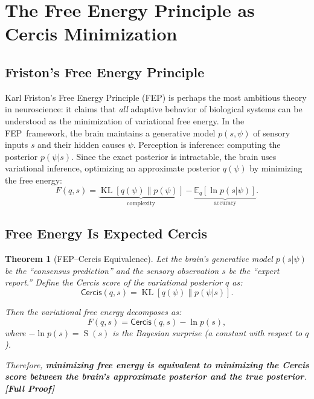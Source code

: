 \documentclass[12pt,a4paper]{article}
\newtheorem{theorem}{Theorem}[section]
\theoremstyle{remark}
\newcommand{\E}{\mathbb{E}}
\newcommand{\Cercis}{\textsf{Cercis}}
\newcommand{\FEP}{\textsf{FEP}}
\newcommand{\FreeEnergy}{F}
\DeclareMathOperator{\KL}{KL}
\DeclareMathOperator{\Surprise}{S}
\newcommand{\rigorFull}{\textbf{[Full Proof]}}
\begin{document}
\section{The Free Energy Principle as Cercis Minimization}
\label{sec:fep}

\subsection{Friston's Free Energy Principle}

Karl Friston's Free Energy Principle (\FEP) \cite{friston2010free,
friston2009free} is perhaps the most ambitious theory in neuroscience: it
claims that \emph{all} adaptive behavior of biological systems can be
understood as the minimization of variational free energy. In the \FEP\
framework, the brain maintains a generative model $p(s, \psi)$ of sensory
inputs $s$ and their hidden causes $\psi$. Perception is inference: computing
the posterior $p(\psi | s)$. Since the exact posterior is intractable, the
brain uses variational inference, optimizing an approximate posterior
$q(\psi)$ by minimizing the free energy:
\begin{equation}\label{eq:fep-free-energy}
    \FreeEnergy(q, s) = \underbrace{\KL[q(\psi) \| p(\psi)]}_{\text{complexity}} - \underbrace{\E_q[\ln p(s | \psi)]}_{\text{accuracy}}.
\end{equation}

\subsection{Free Energy Is Expected Cercis}

\begin{theorem}[FEP--Cercis Equivalence]\label{thm:fep-cercis}
Let the brain's generative model $p(s | \psi)$ be the ``consensus prediction''
and the sensory observation $s$ be the ``expert report.'' Define the
\Cercis{} score of the variational posterior $q$ as:
\begin{equation}\label{eq:cercis-variational}
    \Cercis(q, s) = \KL[q(\psi) \| p(\psi | s)].
\end{equation}

Then the variational free energy decomposes as:
\begin{equation}\label{eq:fep-decomp}
    \FreeEnergy(q, s) = \Cercis(q, s) - \ln p(s),
\end{equation}
where $-\ln p(s) = \Surprise(s)$ is the Bayesian surprise (a constant with
respect to $q$).

Therefore, \textbf{minimizing free energy is equivalent to minimizing the
\Cercis{} score between the brain's approximate posterior and the true
posterior}. \rigorFull
\end{theorem}
\end{document}
